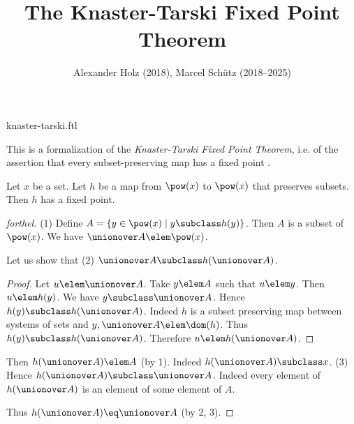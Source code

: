 \documentclass{stex}
\title{The Knaster-Tarski Fixed Point Theorem}
\author{Alexander Holz (2018), Marcel Schütz (2018--2025)}
\date{}
\begin{document}
\begin{smodule}{knaster-tarski.ftl}
\maketitle


\noindent This is a formalization of the \textit{Knaster-Tarski Fixed Point
Theorem}, i.e. of the assertion that every subset-preserving map has a fixed
point \cite{Schroeder2012}.

\begin{theorem}[forthel,title=Knaster-Tarski,id=knaster_tarski]
  Let $x$ be a set.
  Let $h$ be a map from $\pow(x)$ to $\pow(x)$ that preserves subsets.
  Then $h$ has a fixed point.
\end{theorem}
\begin{proof}[forthel]
  (1) Define $A = \{y \in \pow(x) \mid y \subclass h(y)\}$.
  Then $A$ is a subset of $\pow(x)$.
  We have $\unionover A \elem \pow(x)$.

  Let us show that (2) $\unionover A \subclass h(\unionover A)$.
  \begin{proof}
    Let $u \elem \unionover A$.
    Take $y \elem A$ such that $u \elem y$.
    Then $u \elem h(y)$.
    We have $y \subclass \unionover A$.
    Hence $h(y) \subclass h(\unionover A)$.
    Indeed $h$ is a subset preserving map between systems of sets and $y, \unionover A \elem \dom(h)$.
    Thus $h(y) \subclass h(\unionover A)$.
    Therefore $u \elem h(\unionover A)$.
  \end{proof}

  Then $h(\unionover A) \elem A$ (by 1).
  Indeed $h(\unionover A) \subclass x$.
  (3) Hence $h(\unionover A) \subclass \unionover A$.
  Indeed every element of $h(\unionover A)$ is an element of some element of $A$.

  Thus $h(\unionover A) \eq \unionover A$ (by 2, 3).
\end{proof}

\printbibliography
{}
\end{smodule}
\end{document}
